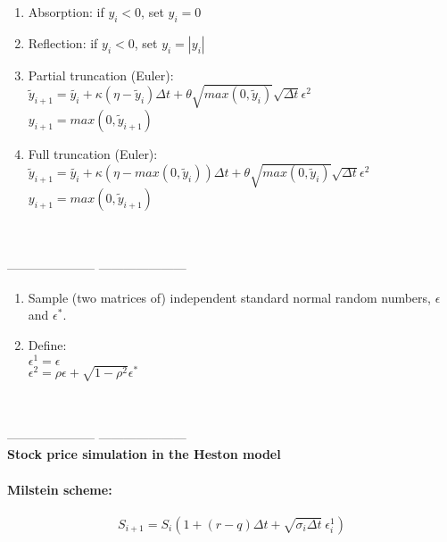 \begin{enumerate}
    \item Absorption: if $y_i<0$, set $y_i=0$
    \item Reflection: if $y_i<0$, set $y_i=|y_i|$
    \item Partial truncation (Euler):\\
    $\tilde{y}_{i+1} = \tilde{y_i} +\kappa(\eta -\tilde{y}_i)\Delta t + \theta \sqrt{max(0,\tilde{y}_i)} \sqrt{\Delta t} \epsilon^2 $\\
    $y_{i+1} = max (0,\tilde{y}_{i+1})$
    \item Full truncation (Euler):\\
        $\tilde{y}_{i+1} = \tilde{y_i} +\kappa(\eta -max(0,\tilde{y}_i))\Delta t + \theta \sqrt{max(0,\tilde{y}_i)} \sqrt{\Delta t} \epsilon^2 $\\
    $y_{i+1} = max (0,\tilde{y}_{i+1})$ 
\end{enumerate}

~\\~\\---------------------
---------------------\\

\begin{enumerate}
    \item Sample (two matrices of) independent standard normal
random numbers, $\epsilon$ and $\epsilon^*$.
    \item Define:\\ $\epsilon^1 = \epsilon$ \\ $\epsilon^2 = \rho\epsilon + \sqrt{1-\rho^2}\epsilon^*$
\end{enumerate}

~\\~\\---------------------
---------------------\\
\textbf{Stock price simulation in the Heston model}\\\\ 
\textbf{Milstein scheme:}\\\\ 

\begin{equation}
S_{i+1} =  S_i\left(1+ (r-q)\Delta t + \sqrt{\sigma_i\Delta t} \ \epsilon_{i}^1\right)
\end{equation} 

